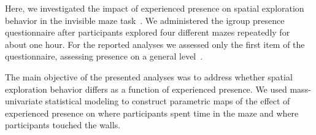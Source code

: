 Here, we investigated the impact of experienced presence on spatial exploration behavior in the invisible maze task~\cite{gehrke2018}. We administered the igroup presence questionnaire after participants explored four different mazes repeatedly for about one hour. For the reported analyses we assessed only the first item of the questionnaire, assessing presence on a general level~\cite{igroup}.

The main objective of the presented analyses was to address whether spatial exploration behavior differs as a function of experienced presence. We used mass-univariate statistical modeling to construct parametric maps of the effect of experienced presence on where participants spent time in the maze and where participants touched the walls. 